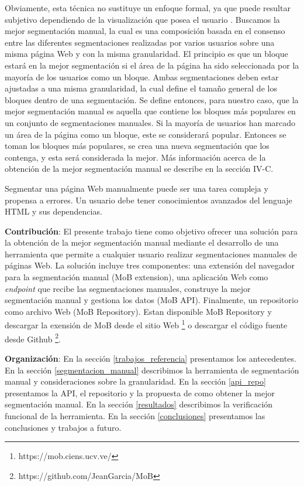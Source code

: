 \documentclass[10pt]{revecom}
\begin{document}
%
Obviamente, esta técnica no sustituye un enfoque formal, ya que puede resultar subjetivo dependiendo de la visualización que posea el usuario \cite{Cai:APWEB:2003}. 
%
Buscamos la mejor segmentación manual, la cual es una composición basada en el consenso entre las diferentes segmentaciones realizadas por varios usuarios sobre una misma página Web y con la misma granularidad.
%
El principio es que un bloque estará en la mejor segmentación si el área de la página ha sido seleccionada por la mayoría de los usuarios como un bloque.
%
Ambas segmentaciones deben estar ajustadas a una misma granularidad, la cual define el tamaño general de los bloques dentro de una segmentación. Se define entonces, para nuestro caso, que la mejor segmentación manual es aquella que contiene los bloques más populares en un conjunto de segmentaciones manuales.
Si la mayoría de usuarios han marcado un área de la página como un bloque, este se considerará popular.
Entonces se toman los bloques más populares, se crea una nueva segmentación que los contenga, y esta será considerada la mejor. Más información acerca de la obtención de la mejor segmentación manual se describe en la sección IV-C.  

%
Segmentar una página Web manualmente puede ser una tarea compleja y propensa a errores. 
%
Un usuario debe tener conocimientos avanzados del lenguaje HTML y sus dependencias.
%

\textbf{Contribución}: 
El presente trabajo tiene como objetivo ofrecer una solución para la obtención de la mejor segmentación manual mediante el desarrollo de una herramienta que permite a cualquier usuario realizar segmentaciones manuales de páginas Web.
La solución incluye tres componentes: una extensión del navegador para la segmentación manual (MoB extension), una aplicación Web como \textit{endpoint} que recibe las segmentaciones manuales, construye la mejor segmentación manual y gestiona los datos (MoB API). Finalmente, un repositorio como archivo Web (MoB Repository).
Estan disponible MoB Repository y descargar la exensión de MoB desde el sitio Web \footnote{https://mob.ciens.ucv.ve/} o descargar el código fuente desde Github \footnote{https://github.com/JeanGarcia/MoB}. 

\textbf{Organización}: 
En la sección \ref{trabajos_referencia} presentamos los antecedentes. 
En la sección \ref{segmentacion_manual} describimos la herramienta de segmentación manual y consideraciones sobre la granularidad. 
En la sección \ref{api_repo} presentamos la API, el repositorio y la propuesta de como obtener la mejor segmentación manual. 
En la sección \ref{resultados} describimos la verificación funcional de la herramienta. 
En la sección \ref{conclusiones} presentamos las conclusiones y trabajos a futuro.
\end{document}
